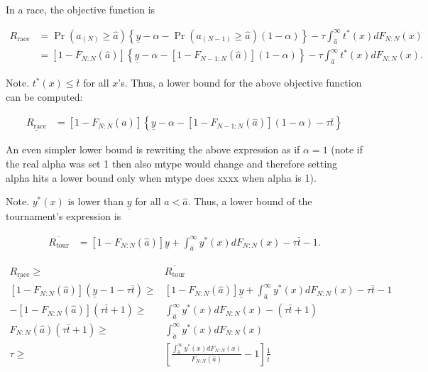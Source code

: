 \documentclass[10pt, titlepage]{article}
\newcommand\deadline{\bar{t}}
\newcommand\target{\underline{y}}
\newcommand\race{\text{race}}
\newcommand\tournament{\text{tour}}
\newcommand\mtype{\hat{a}}
\begin{document}
In a race, the objective function is

\begin{align}
R_\race & =  
  \Pr(a_{(N)}\geq \mtype) \left\{\target - \alpha -
  \Pr(a_{(N-1)}\geq \mtype) (1-\alpha) \right\}
  - \tau \int_{\mtype}^{\infty} t^*(x) dF_{N:N}(x) \nonumber\\
  & = [1-F_{N:N}(\mtype)] \left\{\target - \alpha -
  [1-F_{N-1:N}(\mtype)] (1 - \alpha) \right\}
  - \tau \int_{\mtype}^{\infty} t^*(x) dF_{N:N}(x).
\end{align}

Note. \(t^*(x) \leq \deadline\) for all \(x\)'s. Thus, a lower bound for
the above objective function can be computed:

\begin{align}
\underline {R_\race} & = 
  [1-F_{N:N}(\mtype)] \left\{\target - \alpha -
  [1-F_{N-1:N}(\mtype)] (1 - \alpha) - \tau \deadline\right\}
\end{align}

An even simpler lower bound is rewriting the above expression as if
\(\alpha=1\) (note if the real alpha was set 1 then also mtype would
change and therefore setting alpha hits a lower bound only when mtype
does xxxx when alpha is 1).

Note. \(y^*(x)\) is lower than \(\target\) for all \(a < \mtype\). Thus,
a lower bound of the tournament's expression is

\begin{align}
\overline {R_\tournament} & = 
  [1-F_{N:N}(\mtype)] \target + \int_{\mtype}^\infty y^*(x) dF_{N:N}(x) 
  - \tau \deadline - 1. 
\end{align}

\begin{align}
  \underline {R_\race} \geq & \overline {R_\tournament} \nonumber\\
  [1-F_{N:N}(\mtype)] (\target - 1 - \tau \deadline) \geq &
  [1-F_{N:N}(\mtype)] \target + \int_{\mtype}^\infty y^*(x) dF_{N:N}(x) 
  - \tau \deadline - 1 \nonumber\\
  - [1-F_{N:N}(\mtype)] (\tau\deadline + 1) \geq &
  \int_{\mtype}^\infty y^*(x) dF_{N:N}(x) 
  - (\tau \deadline + 1) \nonumber\\
  F_{N:N}(\mtype) (\tau \deadline + 1) \geq &
  \int_{\mtype}^\infty y^*(x) dF_{N:N}(x) \nonumber\\
  \tau \geq & 
    \left[
      \frac{\int_{\mtype}^\infty y^*(x) dF_{N:N}(x)}{F_{N:N}(\mtype)} -1 
    \right] \frac{1}{\deadline}
\end{align}
\end{document}
